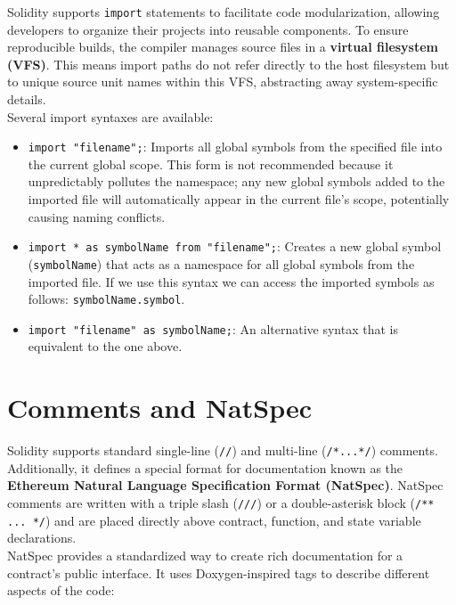 \documentclass{scrbook}
\begin{document}
Solidity supports \texttt{import} statements to facilitate code modularization, allowing developers to organize their projects into reusable components. To ensure reproducible builds, the compiler manages source files in a \textbf{virtual filesystem (VFS)}. This means import paths do not refer directly to the host filesystem but to unique source unit names within this VFS, abstracting away system-specific details.\\

Several import syntaxes are available:

\begin{itemize}
    \item \texttt{import "filename";}: Imports all global symbols from the specified file into the current global scope. This form is not recommended because it unpredictably pollutes the namespace; any new global symbols added to the imported file will automatically appear in the current file's scope, potentially causing naming conflicts.
    
    \item \texttt{import * as symbolName from "filename";}: Creates a new global symbol (\texttt{symbolName}) that acts as a namespace for all global symbols from the imported file. If we use this syntax we can access the imported symbols as follows: \texttt{symbolName.symbol}.
    
    \item \texttt{import "filename" as symbolName;}: An alternative syntax that is equivalent to the one above.
\end{itemize}

\section{Comments and NatSpec}

Solidity supports standard single-line (\texttt{//}) and multi-line (\texttt{/*...*/}) comments. Additionally, it defines a special format for documentation known as the \textbf{Ethereum Natural Language Specification Format (NatSpec)}. NatSpec comments are written with a triple slash (\texttt{///}) or a double-asterisk block (\texttt{/** ... */}) and are placed directly above contract, function, and state variable declarations.\\

NatSpec provides a standardized way to create rich documentation for a contract's public interface. It uses Doxygen-inspired tags to describe different aspects of the code:
\end{document}
